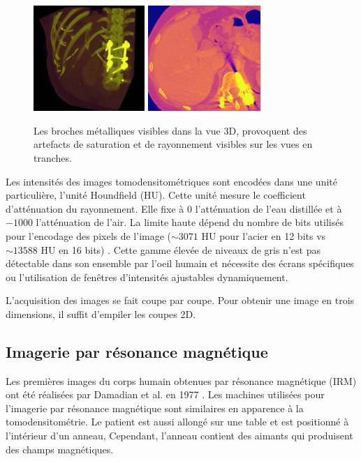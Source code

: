\begin{figure}
    \centering
    \includegraphics[height=4cm]{Images/broaches_CT.png}
    \includegraphics[height=4cm]{Images/broaches_CT_slice.png}
    \caption{Les broches métalliques visibles dans la vue 3D, provoquent des artefacts de saturation et de rayonnement visibles sur les vues en tranches.}
    \label{fig:metallic artefacts}
\end{figure}

Les intensités des images tomodensitométriques sont encodées dans une unité particulière, l'unité Houndfield (HU). Cette unité mesure le coefficient d'atténuation du rayonnement. Elle fixe à 0 l'atténuation de l'eau distillée et à $-1000$ l'atténuation de l'air. La limite haute dépend du nombre de bits utilisés pour l'encodage des pixels de l'image ($\sim 3071$ HU pour l'acier en 12 bits vs $\sim 13588$ HU en 16 bits) \cite{Glide2013_metal_saturation}. Cette gamme élevée de niveaux de gris n'est pas détectable dans son ensemble par l'oeil humain et nécessite des écrans spécifiques ou l'utilisation de fenêtres d'intensités ajustables dynamiquement.

L'acquisition des images se fait coupe par coupe. Pour obtenir une image en trois dimensions, il suffit d'empiler les coupes 2D.

\subsection{Imagerie par résonance magnétique}
\label{sec:contexte:images:irm}

Les premières images du corps humain obtenues par résonance magnétique (IRM) ont été réalisées par Damadian et al. en 1977 \cite{Damadian1977_NMRI}. Les machines utilisées pour l'imagerie par résonance magnétique sont similaires en apparence à la tomodensitométrie. Le patient est aussi allongé sur une table et est positionné à l'intérieur d'un anneau, Cependant, l'anneau contient des aimants qui produisent des champs magnétiques.

